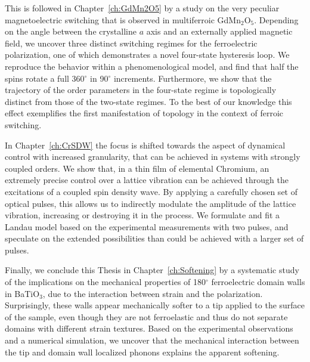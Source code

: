 \documentclass[phd, titlesmallcaps,copyrightpage,foronline,oneside]{SNSthesis}
\begin{document}
This is followed in Chapter~\ref{ch:GdMn2O5} by a study on the very peculiar magnetoelectric switching that is observed in multiferroic GdMn$_2$O$_5$.
Depending on the angle between the crystalline $a$ axis and an externally applied magnetic field, we uncover three distinct switching regimes for the ferroelectric polarization, one of which demonstrates a novel four-state hysteresis loop.
We reproduce the behavior within a phenomenological model, and find that half the spins rotate a full 360$^\circ$ in 90$^\circ$ increments.
Furthermore, we show that the trajectory of the order parameters in the four-state regime is topologically distinct from those of the two-state regimes. To the best of our knowledge this effect exemplifies the first manifestation of topology in the context of ferroic switching.

In Chapter~\ref{ch:CrSDW} the focus is shifted towards the aspect of dynamical control with increased granularity, that can be achieved in systems with strongly coupled orders.
We show that, in a thin film of elemental Chromium, an extremely precise control over a lattice vibration can be achieved through the excitations of a coupled spin density wave.
By applying a carefully chosen set of optical pulses, this allows us to indirectly modulate the amplitude of the lattice vibration, increasing or destroying it in the process.
We formulate and fit a Landau model based on the experimental measurements with two pulses, and speculate on the extended possibilities than could be achieved with a larger set of pulses. 

Finally, we conclude this Thesis in Chapter~\ref{ch:Softening} by a systematic study of the implications on the mechanical properties of 180$^\circ$ ferroelectric domain walls in BaTiO$_3$, due to the interaction between strain and the polarization.
Surprisingly, these walls appear mechanically softer to a tip applied to the surface of the sample, even though they are not ferroelastic and thus do not separate domains with different strain textures.
Based on the experimental observations and a numerical simulation, we uncover that the mechanical interaction between the tip and domain wall localized phonons explains the apparent softening.
\end{document}
